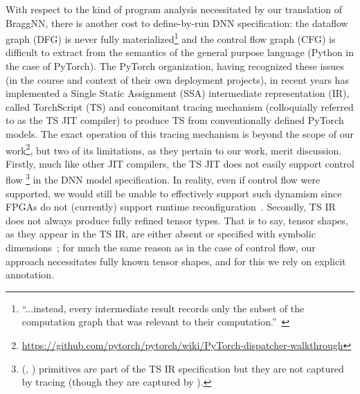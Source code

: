 With respect to the kind of program analysis necessitated by our translation of BraggNN, there is another cost to define-by-run DNN specification: the dataflow graph (DFG) is never fully materialized\footnote{``...instead, every intermediate result records only the subset of the computation graph that was relevant to their computation.''~\cite{paszke2017automatic}} and the control flow graph (CFG) is difficult to extract from the semantics of the general purpose language (Python in the case of PyTorch).
The PyTorch organization, having recognized these issues (in the course and context of their own deployment projects), in recent years has implemented a Single Static Assignment (SSA) intermediate representation (IR), called TorchScript (TS) and concomitant tracing mechanism (colloquially referred to as the TS JIT compiler) to produce TS from conventionally defined PyTorch models.
The exact operation of this tracing mechanism is beyond the scope of our work\footnote{\url{https://github.com/pytorch/pytorch/wiki/PyTorch-dispatcher-walkthrough}}, but two of its limitations, as they pertain to our work, merit discussion.
Firstly, much like other JIT compilers, the TS JIT does not easily support control flow \footnote{(, ) primitives are part of the TS IR specification but they are not captured by tracing (though they are captured by ).} in the DNN model specification.
In reality, even if control flow were supported, we would still be unable to effectively support such dynamism since FPGAs do not (currently) support runtime reconfiguration~\cite{reconfigfpga}.
Secondly, TS IR does not always produce fully refined tensor types.
That is to say, tensor shapes, as they appear in the TS IR, are either absent or specified with symbolic dimensions~\cite{10.1145/3211346.3211348}; for much the same reason as in the case of control flow, our approach necessitates fully known tensor shapes, and for this we rely on explicit annotation.


